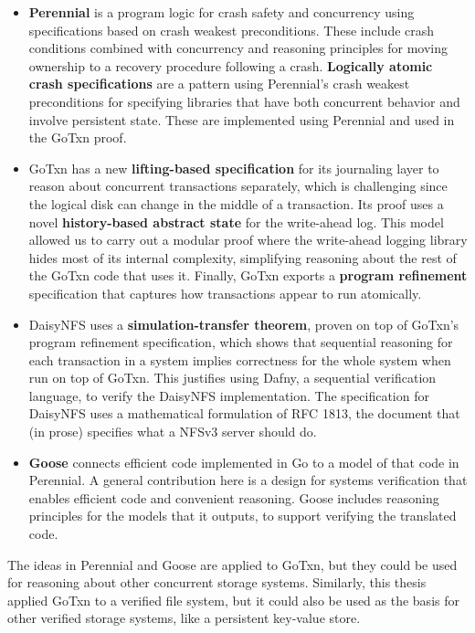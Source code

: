 \begin{itemize}
  \item \textbf{Perennial} is a program logic for crash safety
        and concurrency using specifications based on crash weakest
        preconditions. These include crash conditions combined with concurrency
        and reasoning principles for moving ownership to a recovery procedure
        following a crash. \textbf{Logically atomic crash specifications} are a
        pattern using Perennial's crash weakest preconditions for specifying
        libraries that have both concurrent behavior and involve persistent
        state. These are implemented using Perennial and used in the GoTxn
        proof.
  \item GoTxn has a new \textbf{lifting-based specification} for its journaling
        layer to reason about concurrent transactions separately, which is
        challenging since the logical disk can change in the middle of a transaction. Its proof uses a novel
        \textbf{history-based abstract state} for the write-ahead log. This model allowed us to carry
        out a modular proof where the write-ahead logging library hides most of
        its internal complexity, simplifying reasoning about the rest of the GoTxn
        code that uses it. Finally, GoTxn exports a \textbf{program refinement}
        specification that captures how transactions appear to run atomically.
  \item DaisyNFS uses a \textbf{simulation-transfer theorem}, proven on top of
        GoTxn's program refinement specification, which shows that sequential
        reasoning for each transaction in a system implies correctness for the
        whole system when run on top of GoTxn. This justifies using Dafny, a
        sequential verification language, to verify the DaisyNFS implementation.
        The specification for DaisyNFS uses a mathematical formulation of RFC
        1813, the document that (in prose) specifies what a NFSv3 server should
        do.
  \item \textbf{Goose} connects efficient code implemented in Go to a model of
        that code in Perennial. A general contribution here is a design for
        systems verification that enables efficient code and convenient
        reasoning. Goose includes reasoning principles for the models that it
        outputs, to support verifying the translated code.
\end{itemize}

The ideas in Perennial and Goose are applied to GoTxn, but they could be used
for reasoning about other concurrent storage systems. Similarly,
this thesis applied GoTxn to a verified file system, but it could also be used
as the basis for other verified storage systems, like a persistent key-value
store.

